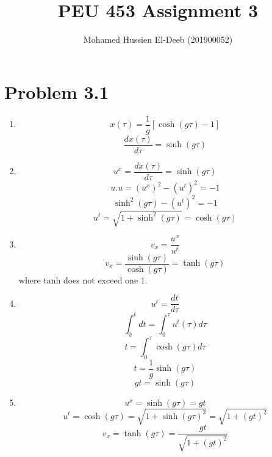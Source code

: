 \documentclass[12pt]{article}
\title{PEU 453 Assignment 3}
\author{Mohamed Hussien El-Deeb (201900052)}
\date{}
\begin{document}
\maketitle
\tableofcontents

\section{Problem 3.1}


\begin{enumerate}[label=\alph*.]
      \item
            \[x(\tau) = \frac{1}{g}[\cosh(g\tau)-1]\]
            \[\frac{d x(\tau)}{d\tau} = \sinh(g\tau)\]
      \item
            \[u^x = \frac{d x(\tau)}{d\tau} = \sinh(g\tau)\]
            \[u.u = {(u^x)}^2-{(u^t)}^2 = -1\]
            \[\sinh^2(g\tau) - {(u^t)}^2 = -1\]
            \[ u^t = \sqrt{1 + \sinh^2(g\tau)} = \cosh(g\tau)\]
      \item
            \[v_x=\frac{u^x}{u^t}\]
            \[v_x=\frac{\sinh(g\tau)}{\cosh(g\tau)} = \tanh(g\tau)\]
            where tanh does not exceed one 1.
      \item
            \[u^t = \frac{dt}{d\tau}\]
            \[\int_0^t dt = \int_0^\tau u^t(\tau) d\tau \]
            \[t = \int_0^\tau \cosh(g\tau) d\tau \]
            \[t = \frac{1}{g} \sinh(g\tau)\]
            \[gt = \sinh(g\tau)\]
      \item
            \[u^x = \sinh(g\tau) = gt\]
            \[u^t = \cosh(g\tau) = \sqrt{1+{\sinh(g\tau)}^2} = \sqrt{1+{(gt)}^2}\]
            \[v_x = \tanh(g\tau) = \frac{gt}{\sqrt{1+{(gt)}^2}}\]
\end{enumerate}

\newpage



\nocite{El-Deeb_PEU-453_Assignments}
\end{document}
